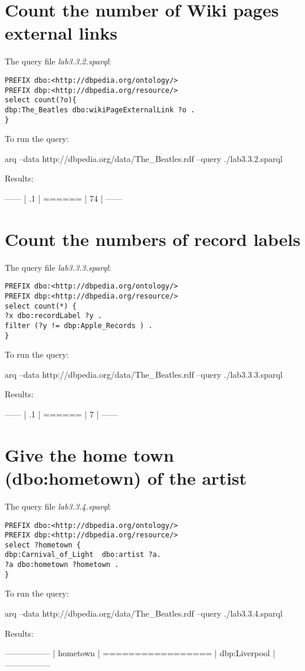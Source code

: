 \documentclass[a4paper, 12pt]{report}
\begin{document}
\section{Count the number of Wiki pages external links}
The query file \emph{lab3.3.2.sparql}:
\begin{lstlisting}[frame=single]
PREFIX dbo:<http://dbpedia.org/ontology/>
PREFIX dbp:<http://dbpedia.org/resource/>
select count(?o){
dbp:The_Beatles dbo:wikiPageExternalLink ?o .
}
\end{lstlisting}
To run the query:
\begin{commandshell}
arq --data http://dbpedia.org/data/The_Beatles.rdf --query ./lab3.3.2.sparql
\end{commandshell}
Results:
\begin{messageshell}
------
| .1 |
======
| 74 |
------
\end{messageshell}

\section{Count the numbers of record labels}
The query file \emph{lab3.3.3.sparql}:
\begin{lstlisting}[frame=single]
PREFIX dbo:<http://dbpedia.org/ontology/>
PREFIX dbp:<http://dbpedia.org/resource/>
select count(*) {
?x dbo:recordLabel ?y .
filter (?y != dbp:Apple_Records ) .
}
\end{lstlisting}
To run the query:
\begin{commandshell}
arq --data http://dbpedia.org/data/The_Beatles.rdf --query ./lab3.3.3.sparql
\end{commandshell}
Results:
\begin{messageshell}
------
| .1 |
======
| 7  |
------
\end{messageshell}

\section{Give the home town (dbo:hometown) of the artist}
The query file \emph{lab3.3.4.sparql}:
\begin{lstlisting}[frame=single]
PREFIX dbo:<http://dbpedia.org/ontology/>
PREFIX dbp:<http://dbpedia.org/resource/>
select ?hometown {
dbp:Carnival_of_Light  dbo:artist ?a.
?a dbo:hometown ?hometown .
}
\end{lstlisting}
To run the query:
\begin{commandshell}
arq --data http://dbpedia.org/data/The_Beatles.rdf --query ./lab3.3.4.sparql
\end{commandshell}
Results:
\begin{messageshell}
-----------------
| hometown      |
=================
| dbp:Liverpool |
-----------------
\end{messageshell}
\end{document}
